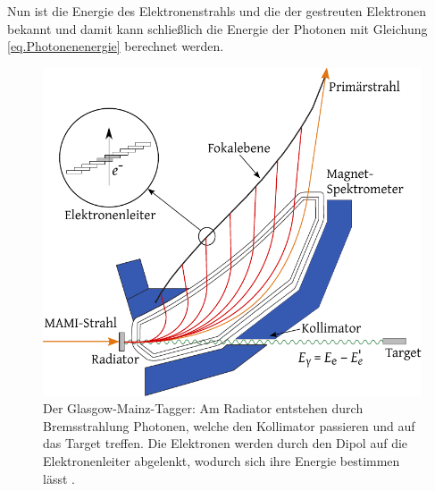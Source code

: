 \documentclass[a4paper,11pt,oneside,final,german,openbib,pdftex]{scrbook}
\begin{document}
{ Nun ist die Energie des Elektronenstrahls und die der gestreuten Elektronen bekannt und damit kann schlie{\ss}lich die Energie der Photonen mit Gleichung \ref{eq.Photonenenergie} berechnet werden.
\newline 
\begin{figure}[h!]
	\begin{center}
	\includegraphics{TAGGER-New}
	
	\caption[Prinzip des Glasgow-Mainz-Taggers]{Der Glasgow-Mainz-Tagger: Am Radiator entstehen durch Bremsstrahlung Photonen, welche den Kollimator passieren und auf das Target treffen. Die Elektronen werden durch den Dipol auf die Elektronenleiter abgelenkt, wodurch sich ihre Energie bestimmen lässt \cite{Un08}.}
\label{fig.TAGGER}	
\end{center}
\end{figure}
 
}
\end{document}

